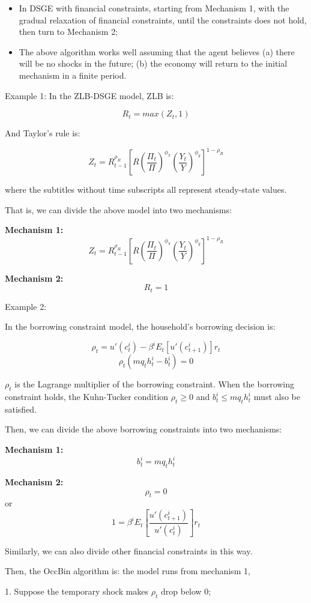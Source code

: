 \documentclass[10pt,math=newtx,citestyle=gb7714-2015,bibstyle=gb7714-2015]{elegantbook}
\begin{document}
{\begin{itemize}
	\item In DSGE with financial constraints, starting from Mechanism 1, with the gradual relaxation of financial constraints, until the constraints does not hold, then turn to Mechanism 2;
	
	\item The above algorithm works well assuming that the agent believes (a) there will be no shocks in the future; (b) the economy will return to the initial mechanism in a finite period.
\end{itemize}

Example 1: In the ZLB-DSGE model, ZLB is:

$$R_t=max(Z_t,1)$$

And Taylor's rule is:

$$Z_t=R_{t-1}^{\rho_R}\left[R\left(\frac{\Pi_t}{\Pi}\right)^{\phi_{\pi}}\left(\frac{Y_t}{Y}\right)^{\phi_y}\right]^{1-\rho_R}$$

where the subtitles without time subscripts all represent steady-state values.

That is, we can divide the above model into two mechanisms:

\textbf{Mechanism 1:}
$$Z_t=R_{t-1}^{\rho_R}\left[R\left(\frac{\Pi_t}{\Pi}\right)^{\phi_{\pi}}\left(\frac{Y_t}{Y}\right)^{\phi_y}\right]^{1-\rho_R}$$

\textbf{Mechanism 2:}
$$R_t=1$$

Example 2:

In the borrowing constraint model, the household's borrowing decision is:

$$\rho_t=u'(c_t^i)-\beta^iE_t\left[u'(c_{t+1}^i)\right]r_t$$
$$\rho_t\left(mq_th_t^i-b_t^i\right)=0$$

$\rho_t$ is the Lagrange multiplier of the borrowing constraint. When the borrowing constraint holds, the Kuhn-Tucker condition $\rho_t\ge0$ and $b_t^i\le mq_th_t^i$ must also be satisfied.

Then, we can divide the above borrowing constraints into two mechanisms:

\textbf{Mechanism 1:}
$$b_t^i=mq_th_t^i$$

\textbf{Mechanism 2:}
$$\rho_t=0$$
or
$$ 1=\beta^iE_t\left[\frac{u'(c_{t+1}^i)}{u'(c_{t}^i)}\right]r_t$$

Similarly, we can also divide other financial constraints in this way.



Then, the OccBin algorithm is: the model runs from mechanism 1,

1. Suppose the temporary shock makes $\rho_t$ drop below 0;

}
\end{document}
